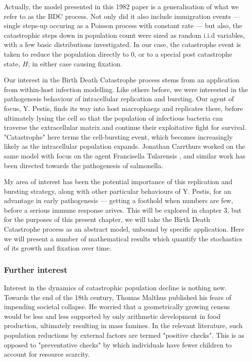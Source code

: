 Actually, the model presented in this 1982 paper is a generalisation of what we refer to as the BDC process. Not only
did it also include immigration events --- single steps-up occuring as a Poisson process with constant rate --- but also, the
catastrophic steps down in population count were sized as random i.i.d variables, with a few basic distributions investigated.
In our case, the catastrophe event is taken to reduce the population directly to 0, or to a special post catastrophe state,
$H$; in either case causing fixation.


Our interest in the Birth Death Catastrophe process stems from an application from within-host infection modelling. Like others before, we were interested in the pathogenesis behaviour of intracellular replication and bursting. Our agent of focus, Y. Pestis,
finds its way into host macrophaegs and replicates there, before ultimately lysing the cell so that the population of
infectious bacteria can traverse the extracellular matrix and continue their exploitative fight for survival.
"Catastrophe" here terms the cell-bursting event, which becomes increasingly likely as the intracellular population expands. 
Jonathan Carrthurs worked on the same model with focus on the agent Francisella Tularensis \cite{carruthers2020stochastic} \cite{karlin1957classification} \cite{karlin1982linear} \cite{di2008note}
, and similar work has
been directed towards the pathogenesis of salmonella.\par
My area of interest has been the potential importance of this replication and bursting strategy, along with other particular
behaviours of Y. Pestis, for an advantage in early pathogenesis --- getting a foothold when numbers are few, before a
serious immune response arives. This will be explored in chapter 3, but for the purposes of this present chapter, we will take the Birth Death Catastrophe process
as an abstract model, unbound by specific application. Here we will present a number of mathematical results which
quantify the stochastics of its growth and fixation over time.\par
\vspace{5pt}



\subsubsection*{Further interest}
Interest in the dynamics of catastrophic population decline is nothing new. Towards the end of the 18th century, 
Thomas Malthus published his fears of impending societal collapse. He worried that a geometrically growing
census would be less and less supported by only arithmetic development in food production, ultimately resulting in mass
famines. In the relevant literature, such population reductions by external factors are termed "positive checks".
This is as opposed to "preventative checks" by which individuals have fewer children to account for resource scarcity.


